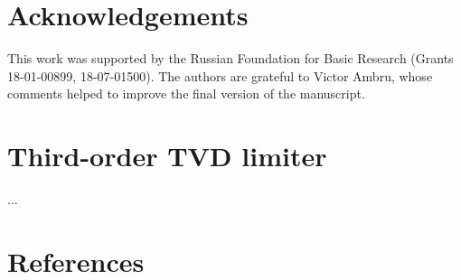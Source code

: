 \documentclass{elsarticle} %
\begin{document}
\section*{Acknowledgements}

This work was supported by the Russian Foundation for Basic Research (Grants 18-01-00899, 18-07-01500).
The authors are grateful to Victor Ambru, whose comments helped to improve the final version of the manuscript.

\appendix

\section{Third-order TVD limiter}\label{sec:limiter}
...

\section*{References}


\end{document}
